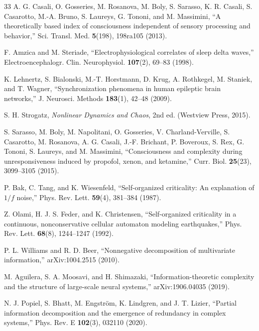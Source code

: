 \documentclass[aip,cha,reprint,amsmath,amssymb]{revtex4-2}
\begin{document}
\begin{thebibliography}{33}
 A. G. Casali, O. Gosseries, M. Rosanova, M. Boly, S. Sarasso, K. R. Casali, S. Casarotto, M.-A. Bruno, S. Laureys, G. Tononi, and M. Massimini, ``A theoretically based index of consciousness independent of sensory processing and behavior,'' Sci. Transl. Med. \textbf{5}(198), 198ra105 (2013).

 F. Amzica and M. Steriade, ``Electrophysiological correlates of sleep delta waves,'' Electroencephalogr. Clin. Neurophysiol. \textbf{107}(2), 69--83 (1998).

 K. Lehnertz, S. Bialonski, M.-T. Horstmann, D. Krug, A. Rothkegel, M. Staniek, and T. Wagner, ``Synchronization phenomena in human epileptic brain networks,'' J. Neurosci. Methods \textbf{183}(1), 42--48 (2009).

 S. H. Strogatz, \emph{Nonlinear Dynamics and Chaos}, 2nd ed. (Westview Press, 2015).

 S. Sarasso, M. Boly, M. Napolitani, O. Gosseries, V. Charland-Verville, S. Casarotto, M. Rosanova, A. G. Casali, J.-F. Brichant, P. Boveroux, S. Rex, G. Tononi, S. Laureys, and M. Massimini, ``Consciousness and complexity during unresponsiveness induced by propofol, xenon, and ketamine,'' Curr. Biol. \textbf{25}(23), 3099--3105 (2015).

 P. Bak, C. Tang, and K. Wiesenfeld, ``Self-organized criticality: An explanation of $1/f$ noise,'' Phys. Rev. Lett. \textbf{59}(4), 381--384 (1987).

 Z. Olami, H. J. S. Feder, and K. Christensen, ``Self-organized criticality in a continuous, nonconservative cellular automaton modeling earthquakes,'' Phys. Rev. Lett. \textbf{68}(8), 1244--1247 (1992).

 P. L. Williams and R. D. Beer, ``Nonnegative decomposition of multivariate information,'' arXiv:1004.2515 (2010).

 M. Aguilera, S. A. Moosavi, and H. Shimazaki, ``Information-theoretic complexity and the structure of large-scale neural systems,'' arXiv:1906.04035 (2019).

 N. J. Popiel, S. Bhatt, M. Engstr{\"o}m, K. Lindgren, and J. T. Lizier, ``Partial information decomposition and the emergence of redundancy in complex systems,'' Phys. Rev. E \textbf{102}(3), 032110 (2020).

\end{thebibliography}
\end{document}
